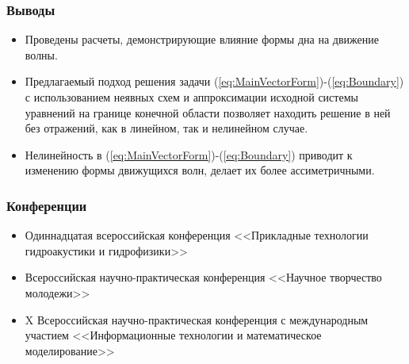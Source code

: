 \documentclass[14pt]{beamer}
\begin{document}
\begin{frame}
\frametitle{Выводы}
\begin{itemize}
	\item Проведены расчеты, демонстрирующие влияние формы дна на движение волны.
	\item Предлагаемый подход решения задачи (\ref{eq:MainVectorForm})-(\ref{eq:Boundary}) с использованием неявных схем и аппроксимации исходной системы уравнений на границе конечной области позволяет находить решение в ней без отражений, как в линейном, так и нелинейном случае.
	\item Нелинейность в (\ref{eq:MainVectorForm})-(\ref{eq:Boundary}) приводит к изменению формы движущихся волн, делает их более ассиметричными. 
\end{itemize}
\end{frame}

\begin{frame}
\frametitle{Конференции}
\begin{itemize}
	\item Одиннадцатая всероссийская конференция <<Прикладные технологии гидроакустики и гидрофизики>>
	\item Всероссийская научно-практическая конференция
<<Научное творчество молодежи>>
	\item X Всероссийская научно-практическая конференция с международным участием <<Информационные технологии
и математическое моделирование>>
\end{itemize}
\end{frame}
\end{document}
